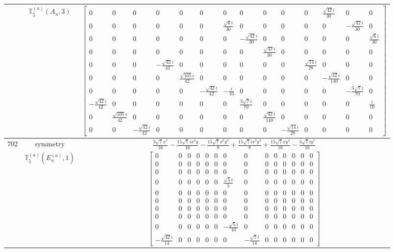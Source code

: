 \documentclass[fleqn,8pt,landscape]{jsarticle}
\begin{document}
\begin{longtable}{ccc}
$  $ & $ \mathbb{T}_{5}^{(a)}(A_{u},3) $ & $ \begin{bmatrix} 0 & 0 & 0 & 0 & 0 & 0 & 0 & 0 & 0 & 0 & 0 & \frac{\sqrt{42} i}{30} & 0 & 0 \\ 0 & 0 & 0 & 0 & 0 & 0 & \frac{\sqrt{6} i}{30} & 0 & 0 & 0 & 0 & 0 & - \frac{\sqrt{42} i}{30} & 0 \\ 0 & 0 & 0 & 0 & 0 & 0 & 0 & - \frac{\sqrt{42} i}{30} & 0 & 0 & 0 & 0 & 0 & \frac{\sqrt{6} i}{30} \\ 0 & 0 & 0 & 0 & 0 & 0 & 0 & 0 & \frac{\sqrt{42} i}{30} & 0 & 0 & 0 & 0 & 0 \\ 0 & 0 & 0 & - \frac{\sqrt{42} i}{42} & 0 & 0 & 0 & 0 & 0 & 0 & \frac{\sqrt{14} i}{28} & 0 & 0 & 0 \\ 0 & 0 & 0 & 0 & \frac{\sqrt{105} i}{42} & 0 & 0 & 0 & 0 & 0 & 0 & - \frac{\sqrt{42} i}{140} & 0 & 0 \\ 0 & 0 & 0 & 0 & 0 & - \frac{\sqrt{42} i}{42} & - \frac{i}{10} & 0 & 0 & 0 & 0 & 0 & - \frac{3 \sqrt{7} i}{70} & 0 \\ - \frac{\sqrt{42} i}{42} & 0 & 0 & 0 & 0 & 0 & 0 & \frac{3 \sqrt{7} i}{70} & 0 & 0 & 0 & 0 & 0 & \frac{i}{10} \\ 0 & \frac{\sqrt{105} i}{42} & 0 & 0 & 0 & 0 & 0 & 0 & \frac{\sqrt{42} i}{140} & 0 & 0 & 0 & 0 & 0 \\ 0 & 0 & - \frac{\sqrt{42} i}{42} & 0 & 0 & 0 & 0 & 0 & 0 & - \frac{\sqrt{14} i}{28} & 0 & 0 & 0 & 0 \end{bmatrix} $ \\ \hline
$ 702 $ & $ \text{symmetry} $ & $ \frac{3 \sqrt{7} x^{5}}{16} - \frac{15 \sqrt{7} i x^{4} y}{16} - \frac{15 \sqrt{7} x^{3} y^{2}}{8} + \frac{15 \sqrt{7} i x^{2} y^{3}}{8} + \frac{15 \sqrt{7} x y^{4}}{16} - \frac{3 \sqrt{7} i y^{5}}{16} $ \\
$  $ & $ \mathbb{T}_{5}^{(a)}(E_{u}^{(a)},1) $ & $ \begin{bmatrix} 0 & 0 & 0 & 0 & 0 & 0 & 0 & 0 & 0 & 0 & 0 & 0 & 0 & 0 \\ 0 & 0 & 0 & 0 & 0 & 0 & 0 & 0 & 0 & 0 & 0 & 0 & 0 & 0 \\ 0 & 0 & 0 & 0 & 0 & 0 & 0 & 0 & 0 & 0 & 0 & 0 & 0 & 0 \\ 0 & 0 & 0 & 0 & 0 & 0 & \frac{\sqrt{5} i}{5} & 0 & 0 & 0 & 0 & 0 & 0 & 0 \\ 0 & 0 & 0 & 0 & 0 & 0 & 0 & 0 & 0 & 0 & 0 & 0 & 0 & 0 \\ 0 & 0 & 0 & 0 & 0 & 0 & 0 & 0 & 0 & 0 & 0 & 0 & 0 & 0 \\ 0 & 0 & 0 & 0 & 0 & 0 & 0 & 0 & 0 & 0 & 0 & 0 & 0 & 0 \\ 0 & 0 & 0 & 0 & 0 & 0 & 0 & 0 & 0 & 0 & 0 & 0 & 0 & 0 \\ 0 & 0 & 0 & 0 & 0 & 0 & - \frac{\sqrt{5} i}{10} & 0 & 0 & 0 & 0 & 0 & 0 & 0 \\ - \frac{\sqrt{42} i}{14} & 0 & 0 & 0 & 0 & 0 & 0 & - \frac{\sqrt{7} i}{14} & 0 & 0 & 0 & 0 & 0 & 0 \end{bmatrix} $ \\ \hline

\end{longtable}
\end{document}
